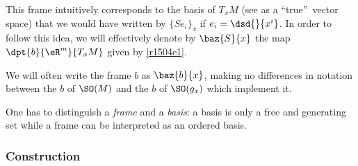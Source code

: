 			This frame intuitively corresponds to the basis of $T_xM$ (see as a ``true''\ vector space) that we would have written by $\{Se_i\}_x$ if $e_i=\dsd{}{x^i}$. In order to follow this idea, we will effectively denote by $\baz{S}{x}$ the map $\dpt{b}{\eR^m}{T_xM}$ given by \eqref{r1504e1}.

			We will often write the frame $b$ as $\baz{b}{x}$, making no differences in notation between the $b$ of $\SO(M)$ and the $b$ of $\SO(g_x)$ which implement it.

			\begin{remark}
			One has to distinguish a \emph{frame} and a \emph{basis}: a basis is only a free and generating set while a frame can be interpreted as an ordered basis.
			\end{remark}


			\subsubsection{Construction}

